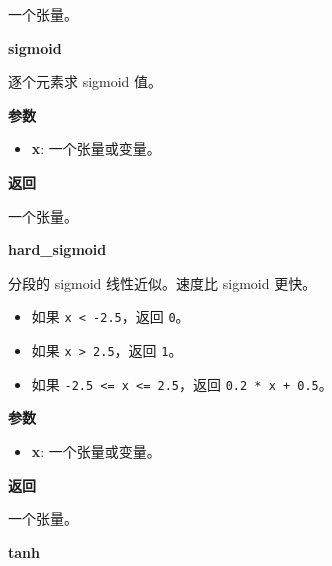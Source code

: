 一个张量。


\textbf{sigmoid}\label{sigmoid}

\begin{Shaded}
\begin{Highlighting}[]
\end{Highlighting}
\end{Shaded}

逐个元素求 sigmoid 值。

\textbf{参数}

\begin{itemize}
\tightlist
\item
  \textbf{x}: 一个张量或变量。
\end{itemize}

\textbf{返回}

一个张量。


\textbf{hard\_sigmoid}\label{hardux5fsigmoid}

\begin{Shaded}
\begin{Highlighting}[]
\end{Highlighting}
\end{Shaded}

分段的 sigmoid 线性近似。速度比 sigmoid 更快。

\begin{itemize}
\tightlist
\item
  如果 \texttt{x\ \textless{}\ -2.5}，返回 \texttt{0}。
\item
  如果 \texttt{x\ \textgreater{}\ 2.5}，返回 \texttt{1}。
\item
  如果 \texttt{-2.5\ \textless{}=\ x\ \textless{}=\ 2.5}，返回
  \texttt{0.2\ *\ x\ +\ 0.5}。
\end{itemize}

\textbf{参数}

\begin{itemize}
\tightlist
\item
  \textbf{x}: 一个张量或变量。
\end{itemize}

\textbf{返回}

一个张量。


\textbf{tanh}\label{tanh}

\begin{Shaded}
\begin{Highlighting}[]
\end{Highlighting}
\end{Shaded}

